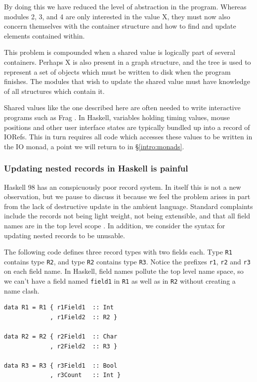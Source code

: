By doing this we have reduced the level of abstraction in the program. Whereas modules 2, 3, and 4 are only interested in the value X, they must now also concern themselves with the container structure and how to find and update elements contained within.

This problem is compounded when a shared value is logically part of several containers. Perhaps X is also present in a graph structure, and the tree is used to represent a set of objects which must be written to disk when the program finishes. The modules that wish to update the shared value must have knowledge of all structures which contain it.

Shared values like the one described here are often needed to write interactive programs such as Frag \cite{cheong:frag}. In Haskell, variables holding timing values, mouse positions and other user interface states are typically bundled up into a record of IORefs. This in turn requires all code which accesses these values to be written in the IO monad, a point we will return to in \S\ref{intro:monads}.


\subsubsection{Updating nested records in Haskell is painful}

Haskell 98 has an conspicuously poor record system. In itself this is not a new observation, but we pause to discuss it because we feel the problem arises in part from the lack of destructive update in the ambient language. Standard complaints include the records not being light weight, not being extensible, and that all field names are in the top level scope \cite{peyton-jones:records}. In addition, we consider the syntax for updating nested records to be unusable.
 
The following code defines three record types with two fields each. Type \texttt{R1} contains type \texttt{R2}, and type \texttt{R2} contains type \texttt{R3}. Notice the prefixes \texttt{r1}, \texttt{r2} and \texttt{r3} on each field name. In Haskell, field names pollute the top level name space, so we can't have a field named \texttt{field1} in \texttt{R1} as well as in \texttt{R2} without creating a name clash.

\clearpage{}
\begin{lstlisting}
data R1 = R1 { r1Field1  :: Int
             , r1Field2  :: R2 }

data R2 = R2 { r2Field1  :: Char
             , r2Field2  :: R3 }

data R3 = R3 { r3Field1  :: Bool
             , r3Count   :: Int }
\end{lstlisting}

